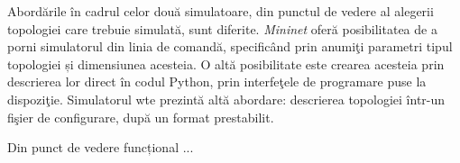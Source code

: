 Abordările în cadrul celor două simulatoare, din punctul de vedere al alegerii topologiei care trebuie simulată, sunt diferite. \textit{Mininet} oferă posibilitatea de a porni simulatorul din linia de comandă, specificând prin anumiţi parametri tipul topologiei și dimensiunea acesteia. O altă posibilitate este crearea acesteia prin descrierea lor direct în codul Python, prin interfeţele de programare puse la dispoziţie. Simulatorul \gls{wte} prezintă altă abordare: descrierea topologiei într-un fişier de configurare, după un format prestabilit.

Din punct de vedere funcțional ...